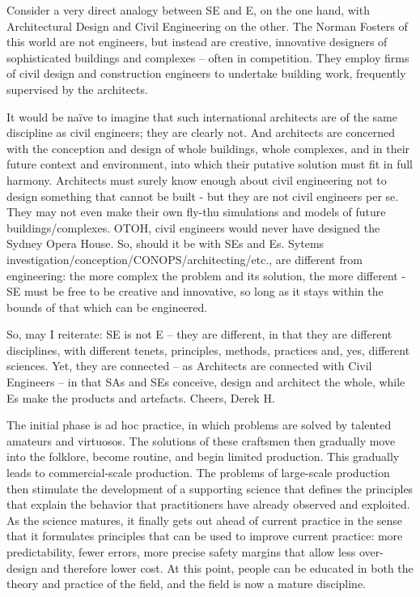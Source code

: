 Consider a very direct analogy between SE and E, on the one hand, with Architectural Design and Civil Engineering on the other. The Norman Fosters of this world are not engineers, but instead are creative, innovative designers of sophisticated buildings and complexes – often in competition. They employ firms of civil design and construction engineers to undertake building work, frequently supervised by the architects.

It would be naïve to imagine that such international architects are of the same discipline as civil engineers; they are clearly not. And architects are concerned with the conception and design of whole buildings, whole complexes, and in their future context and environment, into which their putative solution must fit in full harmony. Architects must surely know enough about civil engineering not to design something that cannot be built - but they are not civil engineers per se. They may not even make their own fly-thu simulations and models of future buildings/complexes. OTOH, civil engineers would never have designed the Sydney Opera House. So, should it be with SEs and Es. Sytems investigation/conception/CONOPS/architecting/etc., are different from engineering: the more complex the problem and its solution, the more different - SE must be free to be creative and innovative, so long as it stays within the bounds of that which can be engineered.

So, may I reiterate: SE is not E – they are different, in that they are different disciplines, with different tenets, principles, methods, practices and, yes, different sciences. Yet, they are connected – as Architects are connected with Civil Engineers – in that SAs and SEs conceive, design and architect the whole, while Es make the products and artefacts. Cheers, Derek H.

The initial phase is ad hoc practice, in which problems are solved by talented amateurs and virtuosos. The solutions of these craftsmen then gradually move into the folklore, become routine, and begin limited production. This gradually leads to commercial-scale production. The problems of large-scale production then stimulate the development of a supporting science that defines the principles that explain the behavior that practitioners have already observed and exploited. As the science matures, it finally gets out ahead of current practice in the sense that it formulates principles that can be used to improve current practice: more predictability, fewer errors, more precise safety margins that allow less over-design and therefore lower cost. At this point, people can be educated in both the theory and practice of the field, and the field is now a mature discipline.

